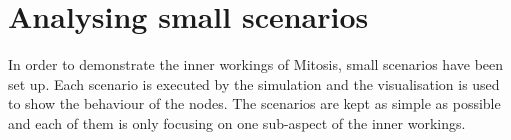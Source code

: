 \section{Analysing small scenarios}
In order to demonstrate the inner workings of Mitosis, small scenarios have been set up. Each scenario is executed by the simulation and the visualisation is used to show the behaviour of the nodes. The scenarios are kept as simple as possible and each of them is only focusing on one sub-aspect of the inner workings.